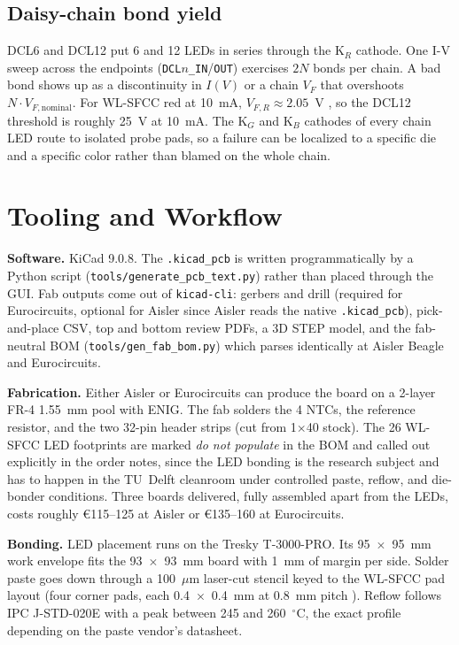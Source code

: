\documentclass[conference]{IEEEtran}
\begin{document}
\subsection{Daisy-chain bond yield}

DCL6 and DCL12 put 6 and 12 LEDs in series through the K$_R$ cathode. One
I-V sweep across the endpoints (\texttt{DCL$n$\_IN}/\texttt{OUT}) exercises
$2N$ bonds per chain. A bad bond shows up as a discontinuity in $I(V)$
or a chain $V_F$ that overshoots $N \cdot V_{F,\text{nominal}}$. For
WL-SFCC red at 10~mA, $V_{F,R} \approx 2.05$~V \cite{wurth_wlsfcc}, so the
DCL12 threshold is roughly 25~V at 10~mA. The K$_G$ and K$_B$ cathodes of
every chain LED route to isolated probe pads, so a failure can be
localized to a specific die and a specific color rather than blamed on
the whole chain.

\section{Tooling and Workflow}

\textbf{Software.} KiCad 9.0.8. The \texttt{.kicad\_pcb} is written
programmatically by a Python script
(\texttt{tools/generate\_pcb\_text.py}) rather than placed through the
GUI. Fab outputs come out of \texttt{kicad-cli}: gerbers and drill
(required for Eurocircuits, optional for Aisler since Aisler reads the
native \texttt{.kicad\_pcb}), pick-and-place CSV, top and bottom review
PDFs, a 3D STEP model, and the fab-neutral BOM
(\texttt{tools/gen\_fab\_bom.py}) which parses identically at Aisler
Beagle and Eurocircuits.

\textbf{Fabrication.} Either Aisler or Eurocircuits can produce the board
on a 2-layer FR-4 1.55~mm pool with ENIG. The fab solders the 4 NTCs,
the reference resistor, and the two 32-pin header strips (cut from
1$\times$40 stock). The 26 WL-SFCC LED footprints are marked \emph{do
not populate} in the BOM and called out explicitly in the order notes,
since the LED bonding is the research subject and has to happen in the
TU~Delft cleanroom under controlled paste, reflow, and die-bonder
conditions. Three boards delivered, fully assembled apart from the LEDs,
costs roughly \euro115--125 at Aisler or \euro135--160 at Eurocircuits.

\textbf{Bonding.} LED placement runs on the Tresky T-3000-PRO. Its
95~$\times$~95~mm work envelope fits the 93~$\times$~93~mm board with 1~mm
of margin per side. Solder paste goes down through a 100~$\mu$m laser-cut
stencil keyed to the WL-SFCC pad layout (four corner pads, each
0.4~$\times$~0.4~mm at 0.8~mm pitch \cite{wurth_wlsfcc}). Reflow follows
IPC J-STD-020E with a peak between 245 and 260~$^\circ$C, the exact
profile depending on the paste vendor's datasheet.
\end{document}

